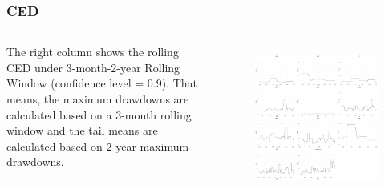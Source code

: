 \documentclass{beamer}
\newcommand\Fontviii{\fontsize{8}{9.2}\selectfont}
\begin{document}
\begin{frame}
\frametitle{CED}
\Fontviii
\begin{columns}[c] %

The right column shows the rolling CED under 3-month-2-year Rolling Window (confidence level = 0.9). That means, the maximum drawdowns are calculated based on a 3-month rolling window and the tail means are calculated based on 2-year maximum drawdowns.

\begin{figure}[h]
\centering 
\includegraphics[width=1\textwidth]{../figures/rolling_stats/CED3mon2yr_scaled}
\label{fig: CED3mon2yr}
\end{figure}
\end{columns}
\end{frame}

\end{document}
